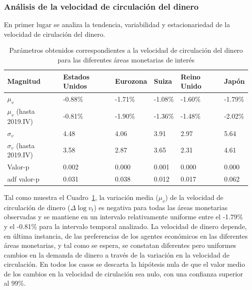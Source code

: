 \documentclass[titlepage, 12pt]{article}
\begin{document}
\subsubsection{Análisis de la velocidad de circulación del dinero}

En primer lugar se analiza la tendencia, variabilidad y estacionariedad de la velocidad de cirulación del dinero.

\begin{table}
    \centering
    \begin{tabular}{llllll}
        \toprule
        Magnitud                   & Estados Unidos & Eurozona & Suiza   & Reino Unido & Japón   \\
        \midrule
        $\mu_v$                    & -0.88\%        & -1.71\%  & -1.08\% & -1.60\%     & -1.79\% \\
        $\mu_v$ (hasta 2019.IV)    & -0.81\%        & -1.90\%  & -1.36\% & -1.48\%     & -2.02\% \\
        $\sigma_v$                 & 4.48           & 4.06     & 3.91    & 2.97        & 5.64    \\
        $\sigma_v$ (hasta 2019.IV) & 3.58           & 2.87     & 3.65    & 2.31        & 4.61    \\
        Valor-p                    & 0.002          & 0.000    & 0.001   & 0.000       & 0.000   \\
        \acrshort{adf} valor-p     & 0.031          & 0.038    & 0.012   & 0.017       & 0.062   \\
        \bottomrule
    \end{tabular}
    \caption{Parámetros obtenidos correspondientes a la velocidad de circulación del dinero para las diferentes áreas monetarias de interés}
    \label{tab:v-params}
\end{table}

Tal como muestra el Cuadro~\ref{tab:v-params}, la variación media ($\mu_v$) de la velocidad de circulación de dinero ($\Delta\log v_t$) es negativa para todas las áreas monetarias observadas y se mantiene en un intervalo relativamente uniforme entre el -1.79\% y el -0.81\% para la intervalo temporal analizado. La velocidad de dinero depende, en última instancia, de las preferencias de los agentes económicos en las diferentes áreas monetarias, y tal como se espera, se constatan diferentes pero uniformes cambios en la demanda de dinero a través de la variación en la velocidad de circulación. En todos los casos se descarta la hipótesis nula de que el valor medio de los cambios en la velocidad de cirulación sea nulo, con una confianza superior al 99\%.
\end{document}

